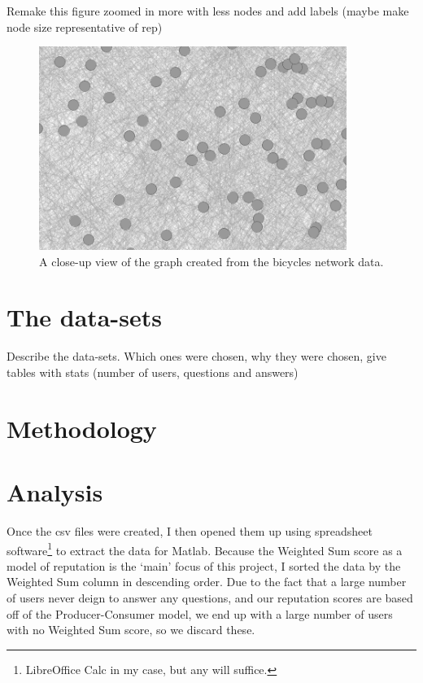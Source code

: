 \documentclass[]{final_report}
\begin{document}
Remake this figure zoomed in more with less nodes and add labels (maybe make node size representative of rep)
\begin{figure}[ht!]
\centering
\includegraphics[width=100mm]{chap4/gephigraph.PNG}
\caption{A close-up view of the graph created from the bicycles network data.}
\end{figure}\label{gra:network}

\section{The data-sets}

Describe the data-sets. Which ones were chosen, why they were chosen, give tables with stats (number of users, questions and answers)

\section{Methodology}

\section{Analysis}

Once the csv files were created, I then opened them up using spreadsheet software\footnote{LibreOffice Calc in my case, but any will suffice.} to extract the data for Matlab. Because the Weighted Sum score as a model of reputation is the `main' focus of this project, I sorted the data by the Weighted Sum column in descending order. Due to the fact that a large number of users never deign to answer any questions, and our reputation scores are based off of the Producer-Consumer model, we end up with a large number of users with no Weighted Sum score, so we discard these.
\end{document}
